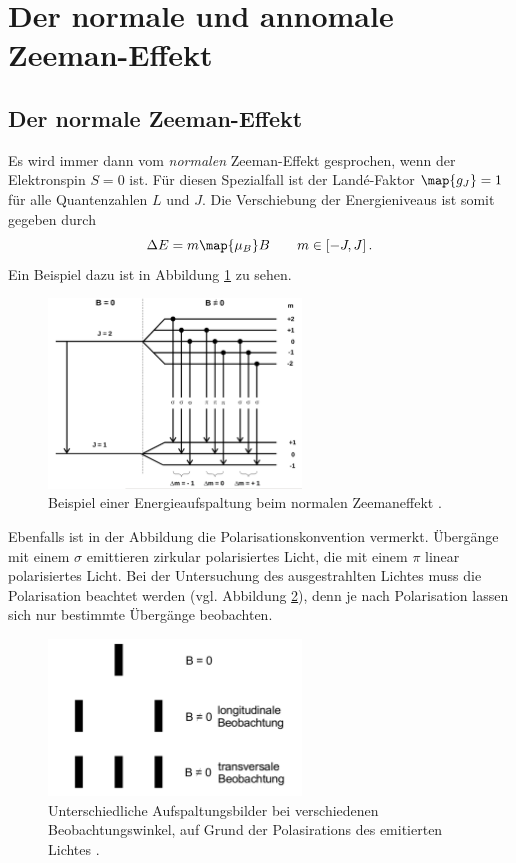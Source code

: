 \section{Der normale und annomale Zeeman-Effekt}

\subsection{Der normale Zeeman-Effekt}
Es wird immer dann vom \emph{normalen} Zeeman-Effekt gesprochen, wenn der Elektronspin $S=0$ ist.
Für diesen Spezialfall ist der Landé-Faktor $\map{g_J}=1$ für alle Quantenzahlen $L$ und $J$. %
Die Verschiebung der Energieniveaus ist somit gegeben durch
\begin{equation}
  \label{eq: energie_normaler_zeeman}
  \Delta E=m\map{\mu_B}B \qquad m\in\left[-J,J\right].
\end{equation}
Ein Beispiel dazu ist in Abbildung \ref{fig: energie_normaler_zeeman} zu sehen.
\FloatBarrier
\begin{figure}[h]
  \centering
  \includegraphics[width=0.6\textwidth]{pics/enerieaufspaltung_normaler_zeeman.png}
  \caption{Beispiel einer Energieaufspaltung beim normalen Zeemaneffekt \cite{anleitung27}.}
  \label{fig: energie_normaler_zeeman}
\end{figure}
\FloatBarrier
Ebenfalls ist in der Abbildung die Polarisationskonvention vermerkt.
Übergänge mit einem $\sigma$ emittieren zirkular polarisiertes Licht, die mit einem %
$\pi$ linear polarisiertes Licht.
Bei der Untersuchung des ausgestrahlten Lichtes muss die Polarisation beachtet werden (vgl. Abbildung \ref{fig: beobachtung_energie}), denn
je nach Polarisation lassen sich nur bestimmte Übergänge beobachten.
\FloatBarrier
\begin{figure}[h]
  \centering
  \includegraphics[width=0.6\textwidth]{pics/beobachtung_energie.png}
  \caption{Unterschiedliche Aufspaltungsbilder bei verschiedenen Beobachtungswinkel, auf Grund der Polasirations des emitierten Lichtes \cite{anleitung27}.}
  \label{fig: beobachtung_energie}
\end{figure}
\FloatBarrier

